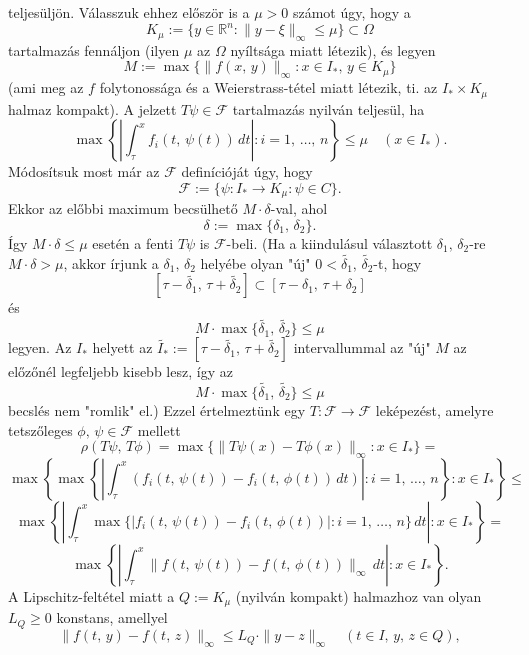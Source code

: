 \documentclass[12pt]{article}
\newcommand{\R}{\mathbb{R}}
\begin{document}
    teljesüljön. Válasszuk ehhez először is a $\mu > 0$ számot úgy, hogy a
    \[
        K_\mu := \{ y \in \R^n : \| y - \xi\|_\infty \leq \mu \} \subset \Omega
    \]
    tartalmazás fennáljon (ilyen $\mu$ az $\Omega$ nyíltsága miatt létezik), és legyen
    \[
        M := \max\{ \| f(x, \, y)\|_\infty : x\in I_*, \, y \in K_\mu \}
    \]
    (ami meg az $f$ folytonossága és a Weierstrass-tétel miatt létezik, ti. az $I_* \times K_\mu$ halmaz kompakt). A jelzett $T\psi \in \mathcal{F}$ tartalmazás nyilván teljesül, ha
    \[
        \max \left\{  \left| \int_\tau^x f_i(t, \, \psi(t)) \, dt \right| : i = 1, \, \dots, \, n \right\} \leq \mu \quad (x \in I_*).
    \]
    Módosítsuk most már az $\mathcal{F}$ definícióját úgy, hogy
    \[
        \mathcal{F} := \{ \psi : I_* \to K_\mu : \psi \in C \}.
    \]
    Ekkor az előbbi maximum becsülhető $M \cdot \delta$-val, ahol
    \[
        \delta := \max\{\delta_1, \, \delta_2\}.
    \]
    Így $M \cdot \delta \leq \mu$ esetén a fenti $T\psi$ is $\mathcal{F}$-beli. (Ha a kiindulásul választott $\delta_1, \, \delta_2$-re $M \cdot \delta > \mu$, akkor írjunk a $\delta_1, \, \delta_2$ helyébe olyan "új" $0 < \tilde{\delta_1}, \, \tilde{\delta_2}$-t, hogy
    \[
        [\tau - \tilde{\delta_1}, \, \tau + \tilde{\delta_2}] \subset [\tau - \delta_1, \, \tau + \delta_2]
    \]
    és
    \[
        M \cdot \max \{ \tilde{\delta_1}, \, \tilde{\delta_2} \} \leq \mu
    \]
    legyen. Az $I_*$ helyett az $\tilde{I_*} := [\tau - \tilde{\delta_1}, \, \tau + \tilde{\delta_2}]$ intervallummal az "új" $M$ az előzőnél legfeljebb kisebb lesz, így az
    \[
        M \cdot \max \{ \tilde{\delta_1}, \, \tilde{\delta_2}\} \leq \mu
    \]
    becslés nem "romlik" el.)
    Ezzel értelmeztünk egy $T : \mathcal{F} \to \mathcal{F}$ leképezést, amelyre tetszőleges $\phi, \, \psi \in \mathcal{F}$ mellett
    \[
        \rho(T\psi, \, T\phi) = \max \{ \| T\psi(x) - T\phi(x)\|_\infty : x \in I_* \} =
    \]
    \[
        \max \left\{  \max \left\{  \left| \int_\tau^x (f_i(t, \, \psi(t)) - f_i(t, \, \phi(t)) \, dt) \right| : i = 1, \, \dots, \, n \right\} : x \in I_* \right\} \leq
    \]
    \[
        \max \left\{  \left| \int_\tau^x \max \{ |f_i(t, \, \psi(t)) - f_i(t, \, \phi(t))| : i = 1, \, \dots, \, n \} \, dt \right| : x \in I_* \right\} =
    \]
    \[
        \max \left\{ \left| \int_\tau^x \| f(t, \, \psi(t)) - f(t, \, \phi(t))\|_\infty \, dt \right| : x \in I_* \right\}.
    \]
    A Lipschitz-feltétel miatt a $Q := K_\mu$ (nyilván kompakt) halmazhoz van olyan $L_Q \geq 0$ konstans, amellyel
    \[
        \| f(t, \, y) - f(t, \, z)\|_\infty \leq L_Q \cdot \| y-z \|_\infty \quad (t \in I, \, y, \, z \in Q),
    \]
\end{document}
